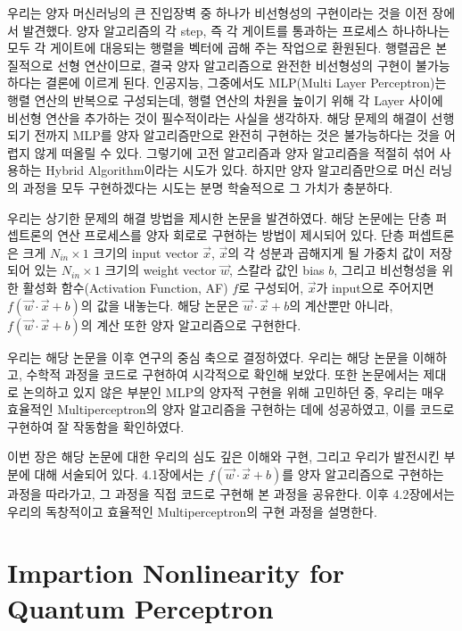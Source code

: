 우리는 양자 머신러닝의 큰 진입장벽 중 하나가 비선형성의 구현이라는 것을 이전 장에서 발견했다.
양자 알고리즘의 각 step, 즉 각 게이트를 통과하는 프로세스 하나하나는 모두 각 게이트에 대응되는 행렬을 벡터에 곱해 주는 작업으로 환원된다. 
행렬곱은 본질적으로 선형 연산이므로, 결국 양자 알고리즘으로 완전한 비선형성의 구현이 불가능하다는 결론에 이르게 된다.
인공지능, 그중에서도 MLP(Multi Layer Perceptron)는 행렬 연산의 반복으로 구성되는데, 행렬 연산의 차원을 높이기 위해 각 Layer 사이에 비선형 연산을 추가하는 것이 필수적이라는 사실을 생각하자.
해당 문제의 해결이 선행되기 전까지 MLP를 양자 알고리즘만으로 완전히 구현하는 것은 불가능하다는 것을 어렵지 않게 떠올릴 수 있다.
그렇기에 고전 알고리즘과 양자 알고리즘을 적절히 섞어 사용하는 Hybrid Algorithm이라는 시도가 있다. 하지만 양자 알고리즘만으로 머신 러닝의 과정을 모두 구현하겠다는 시도는 분명 학술적으로 그 가치가 충분하다.

우리는 상기한 문제의 해결 방법을 제시한 논문을 발견하였다.
해당 논문에는 단층 퍼셉트론의 연산 프로세스를 양자 회로로 구현하는 방법이 제시되어 있다.
단층 퍼셉트론은 크게 \(N_{in} \times 1\) 크기의 input vector \(\vec{x}\), 
\(\vec{x}\)의 각 성분과 곱해지게 될 가중치 값이 저장되어 있는 \(N_{in} \times 1\) 크기의 weight vector \(\vec{w}\), 
스칼라 값인 bias \(b\), 그리고 비선형성을 위한 활성화 함수(Activation Function, AF) \(f\)로 구성되어,
\(\vec{x}\)가 input으로 주어지면 \(f(\vec{w}\cdot\vec{x}+b)\)의 값을 내놓는다.
해당 논문은 \(\vec{w}\cdot\vec{x}+b\)의 계산뿐만 아니라, \(f(\vec{w}\cdot\vec{x}+b)\)의 계산 또한 양자 알고리즘으로 구현한다.

우리는 해당 논문을 이후 연구의 중심 축으로 결정하였다.
우리는 해당 논문을 이해하고, 수학적 과정을 코드로 구현하여 시각적으로 확인해 보았다.
또한 논문에서는 제대로 논의하고 있지 않은 부분인 MLP의 양자적 구현을 위해 고민하던 중, 우리는 매우 효율적인 Multiperceptron의 양자 알고리즘을 구현하는 데에 성공하였고, 이를 코드로 구현하여 잘 작동함을 확인하였다.

이번 장은 해당 논문에 대한 우리의 심도 깊은 이해와 구현, 그리고 우리가 발전시킨 부분에 대해 서술되어 있다.
4.1장에서는 \(f(\vec{w}\cdot\vec{x}+b)\)를 양자 알고리즘으로 구현하는 과정을 따라가고, 그 과정을 직접 코드로 구현해 본 과정을 공유한다.
이후 4.2장에서는 우리의 독창적이고 효율적인 Multiperceptron의 구현 과정을 설명한다.

\section{Impartion Nonlinearity for Quantum Perceptron}

